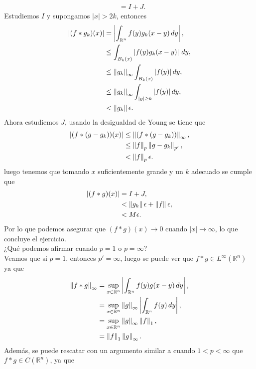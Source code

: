 \begin{homeworkProblem}
\begin{solution}
\begin{enumerate}[(i)]
\begin{align*}
          &= I + J.
        \end{align*}
        Estudiemos $I$ y supongamos $|x|>2k$, entonces 
        \begin{align*}
          \left| (f*g_k)(x) \right|&=\left| \int_{\mathbb{R}^{n}}f(y)g_{k}(x-y)\, dy \right|,\\
          &\leq \int_{B_{k}(x)}\left| f(y)g_{k}(x-y) \right|\, dy,\\
          &\leq \left\|g_k\right\|_{\infty}\int_{B_{k}(x)}|f(y)|\, dy,\\
          &\leq \left\|g_k\right\|_{\infty}\int_{|y|\geq k}|f(y)|\, dy,\\
          &< \left\|g_k\right\|\epsilon.
        \end{align*}
        Ahora estudiemos $J$, usando la desigualdad de Young se tiene que
        \begin{align*}
          \left| (f*(g-g_k))(x) \right|&\leq \left\|(f*(g-g_k))\right\|_{\infty},\\
          &\leq \left\|f\right\|_{p}\left\|g-g_k\right\|_{p'},\\
          &< \left\|f\right\|_{p}\epsilon.
        \end{align*}
        luego tenemos que tomando $x$ suficientemente grande y un $k$ adecuado se cumple que 
        \begin{align*}
          \left| (f*g)(x) \right|&= I+J,\\
          &<\left\|g_k\right\|\epsilon + \left\|f\right\|\epsilon,\\
          &<M\epsilon.
        \end{align*}
        Por lo que podemos asegurar que $(f*g)(x)\to 0$ cuando $|x|\to \infty$, lo que concluye el ejercicio.\\
        ¿Qué podemos afirmar cuando $p=1$ o $p=\infty$?\\
        Veamos que si $p=1$, entonces $p'=\infty$, luego se puede ver que $f*g\in L^{\infty}(\mathbb{R}^{n})$ ya que
        \begin{align*}
          \left\|f*g\right\|_{\infty}&=\sup_{x\in\mathbb{R}^{n}}\left| \int_{\mathbb{R}^{n}}f(y)g(x-y)\, dy \right|,\\
          &=\sup_{x\in\mathbb{R}^{n}}\left\|g\right\|_{\infty}\left| \int_{\mathbb{R}^{n}}f(y)\, dy \right|,\\
          &=\sup_{x\in\mathbb{R}^{n}}\left\|g\right\|_{\infty}\left\|f\right\|_{1},\\
          &=\left\|f\right\|_{1}\left\|g\right\|_{\infty}.
        \end{align*}
        Además, se puede rescatar con un argumento similar a cuando $1<p<\infty$ que $f*g\in C(\mathbb{R}^{n})$, ya que

\end{enumerate}
\end{solution}
\end{homeworkProblem}
